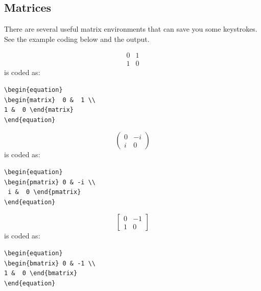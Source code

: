 \documentclass[lettersize,journal]{IEEEtran}
\begin{document}
\subsection{Matrices}
\noindent There are several useful matrix environments that can save you some keystrokes. See the example coding below and the output.

\begin{equation}
\begin{matrix}  0 &  1 \\
1 &  0 \end{matrix}
\end{equation}
is coded as:
\begin{verbatim}
\begin{equation}
\begin{matrix}  0 &  1 \\
1 &  0 \end{matrix}
\end{equation}
\end{verbatim}

\begin{equation}
\begin{pmatrix} 0 & -i \\
 i &  0 \end{pmatrix}
\end{equation}
is coded as:
\begin{verbatim}
\begin{equation}
\begin{pmatrix} 0 & -i \\
 i &  0 \end{pmatrix}
\end{equation}
\end{verbatim}

\begin{equation}
\begin{bmatrix} 0 & -1 \\
1 &  0 \end{bmatrix}
\end{equation}
is coded as:
\begin{verbatim}
\begin{equation}
\begin{bmatrix} 0 & -1 \\
1 &  0 \end{bmatrix}
\end{equation}
\end{verbatim}
\end{document}

